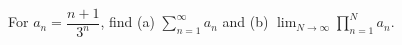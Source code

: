 For $a_n=\dfrac{n+1}{3^n}$, find (a) $\sum_{n=1}^\infty a_n$ and (b) $\lim_{N\to\infty}\prod_{n=1}^N a_n$.
